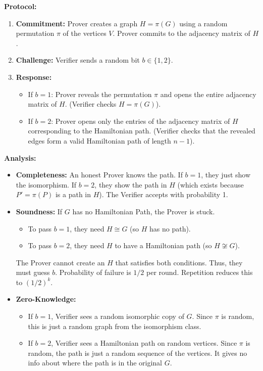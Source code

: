 \documentclass[11pt]{article}
\begin{document}
\textbf{Protocol:}
\begin{enumerate}
    \item \textbf{Commitment:} Prover creates a graph $H = \pi(G)$ using a random permutation $\pi$ of the vertices $V$. Prover commits to the adjacency matrix of $H$.
    \item \textbf{Challenge:} Verifier sends a random bit $b \in \{1, 2\}$.
    \item \textbf{Response:}
    \begin{itemize}
        \item If $b=1$: Prover reveals the permutation $\pi$ and opens the entire adjacency matrix of $H$. (Verifier checks $H = \pi(G)$).
        \item If $b=2$: Prover opens only the entries of the adjacency matrix of $H$ corresponding to the Hamiltonian path. (Verifier checks that the revealed edges form a valid Hamiltonian path of length $n-1$).
    \end{itemize}
\end{enumerate}

\textbf{Analysis:}
\begin{itemize}
    \item \textbf{Completeness:} An honest Prover knows the path. If $b=1$, they just show the isomorphism. If $b=2$, they show the path in $H$ (which exists because $P' = \pi(P)$ is a path in $H$). The Verifier accepts with probability 1.
    \item \textbf{Soundness:} If $G$ has no Hamiltonian Path, the Prover is stuck.
    \begin{itemize}
        \item To pass $b=1$, they need $H \cong G$ (so $H$ has no path).
        \item To pass $b=2$, they need $H$ to have a Hamiltonian path (so $H \not\cong G$).
    \end{itemize}
    The Prover cannot create an $H$ that satisfies both conditions. Thus, they must guess $b$. Probability of failure is $1/2$ per round. Repetition reduces this to $(1/2)^k$.
    \item \textbf{Zero-Knowledge:}
    \begin{itemize}
        \item If $b=1$, Verifier sees a random isomorphic copy of $G$. Since $\pi$ is random, this is just a random graph from the isomorphism class.
        \item If $b=2$, Verifier sees a Hamiltonian path on random vertices. Since $\pi$ is random, the path is just a random sequence of the vertices. It gives no info about where the path is in the original $G$.
    \end{itemize}
\end{itemize}
\end{document}
